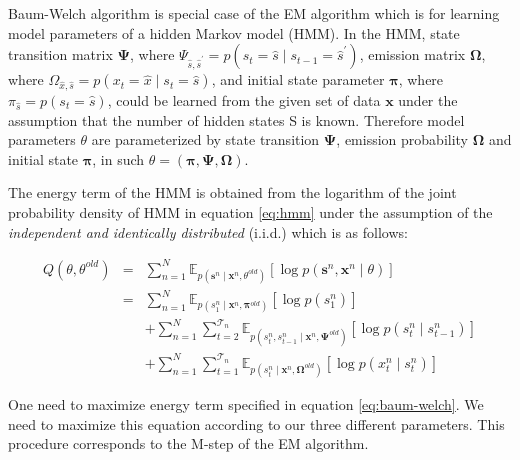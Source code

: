 Baum-Welch algorithm is special case of the EM algorithm which is for learning model parameters of a hidden Markov model (HMM)\cite{tu2015derivation}. In the HMM, state transition matrix $\boldsymbol{\Psi}$, where $\Psi_{\hat{s}, \hat{s}^{\prime}}=p\left(s_{t}=\hat{s} \mid s_{t-1}=\hat{s}^{\prime}\right)$, emission matrix $\boldsymbol{\Omega}$, where $\Omega_{\hat{x}, \hat{s}} = p\left(x_t = \hat{x} \mid s_t = \hat{s} \right)$, and initial state parameter $\boldsymbol{\pi}$, where $\pi_{\hat{s}}=p\left(s_{t}=\hat{s}\right)$, could be learned from the given set of data $\boldsymbol{x}$ under the assumption that the number of hidden states S is known.
Therefore model parameters $\theta$ are parameterized by state transition $\boldsymbol{\Psi}$, emission probability $\boldsymbol{\Omega}$ and initial state $\boldsymbol{\pi}$, in such $\theta = \left(\boldsymbol{\pi}, \boldsymbol{\Psi}, \boldsymbol{\Omega}\right)$\cite{bishop2006pattern}.

The energy term of the HMM is obtained from the logarithm of the joint probability density of HMM in equation \ref{eq:hmm} under the assumption of the {\it independent and identically distributed} (i.i.d.) which is as follows:

\begin{eqnarray}
    Q\left(\theta , \theta^{old}\right) &=&\sum_{n=1}^{N} \mathbb{E}_{p\left(\boldsymbol{s}^{n} \mid \boldsymbol{x}^{n}, \theta^{o l d}\right)}\left[\log p\left(\boldsymbol{s}^{n}, \boldsymbol{x}^{n}\mid \theta\right)\right] \\
    &=&\sum_{n=1}^{N} \mathbb{E}_{p\left(s_{1}^{n} \mid \boldsymbol{x}^{n}, \boldsymbol{\pi}^{o l d}\right)}\left[\log p\left(s_{1}^{n}\right)\right] \nonumber\\
    & &+\sum_{n=1}^{N}\sum_{t=2}^{\mathcal{T}_{n}}\mathbb{E}_{p\left(s_{t}^{n}, s_{t-1}^{n} \mid \boldsymbol{x}^{n}, \boldsymbol{\Psi}^{old}\right)}\left[\log p\left(s_{t}^{n} \mid s_{t-1}^{n}\right)\right] \nonumber\\
    & &+\sum_{n=1}^{N}\sum_{t=1}^{\mathcal{T}_{n}}\mathbb{E}_{p\left(s_{t}^{n} \mid \boldsymbol{x}^{n}, \boldsymbol{\Omega}^{old}\right)}\left[\log p\left(x_{t}^{n} \mid s_{t}^{n}\right)\right] \label{eq:baum-welch}
\end{eqnarray}

One need to maximize energy term specified in equation \ref{eq:baum-welch}. We need to maximize this equation according to our three different parameters. This procedure corresponds to the M-step of the EM algorithm.

